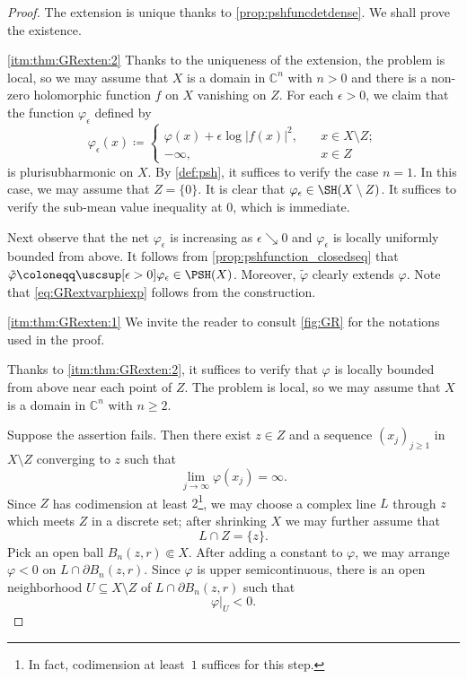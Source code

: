 \begin{proof}
    The extension is unique thanks to \cref{prop:pshfuncdetdense}. We shall prove the existence.

    \ref{itm:thm:GRexten:2} Thanks to the uniqueness of the extension, the problem is local, so we may assume that $X$ is a domain in $\mathbb{C}^n$ with $n>0$ and there is a non-zero holomorphic function $f$ on $X$ vanishing on $Z$. For each $\epsilon>0$, we claim that the function $\varphi_{\epsilon}$ defined by
    \[
    \varphi_{\epsilon}(x)\coloneqq \left\{
    \begin{aligned}
        \varphi(x)+\epsilon\log|f(x)|^2,&\quad x\in X\setminus Z;\\
        -\infty,&\quad x\in Z
    \end{aligned}
    \right.
    \]
    is plurisubharmonic on $X$. By \cref{def:psh}, it suffices to verify the case $n=1$. In this case, we may assume that $Z=\{0\}$.
    It is clear that $ \varphi_{\epsilon}\in \SH(X\setminus Z)$.
    It suffices to verify the sub-mean value inequality at $0$, which is immediate.

    Next observe that the net $\varphi_{\epsilon}$ is increasing as $\epsilon\searrow 0$ and $\varphi_{\epsilon}$ is locally uniformly bounded from above. It follows from \cref{prop:pshfunction_closedseq} that $\tilde{\varphi}\coloneqq \uscsup[\epsilon>0]\varphi_{\epsilon}\in \PSH(X)$. Moreover, $\tilde{\varphi}$ clearly extends $\varphi$. Note that \eqref{eq:GRextvarphiexp} follows from the construction.

    \ref{itm:thm:GRexten:1} We invite the reader to consult \cref{fig:GR} for the notations used in the proof.

    Thanks to \ref{itm:thm:GRexten:2}, it suffices to verify that $\varphi$ is locally bounded from above near each point of $Z$. The problem is local, so we may assume that $X$ is a domain in $\mathbb{C}^n$ with $n\geq 2$.

    Suppose the assertion fails. Then there exist $z\in Z$ and a sequence $(x_j)_{j\geq 1}$ in $X\setminus Z$ converging to $z$ such that
    \begin{equation}\label{eq:limphiinfty_temp1}
    \lim_{j\to\infty} \varphi(x_j)=\infty.
    \end{equation}
    Since $Z$ has codimension at least $2$\footnote{In fact, codimension at least~$1$ suffices for this step.}, we may choose a complex line $L$ through $z$ which meets $Z$ in a discrete set; after shrinking $X$ we may further assume that
    \[
        L\cap Z=\{z\}.
    \]
    Pick an open ball $B_n(z,r)\Subset X$. After adding a constant to $\varphi$, we may arrange $\varphi<0$ on $L\cap \partial B_n(z,r)$. Since $\varphi$ is upper semicontinuous, there is an open
    neighborhood $U\subseteq X\setminus Z$ of $L\cap \partial B_n(z,r)$ such that
    \[
        \varphi|_U<0.
    \]


\end{proof}
